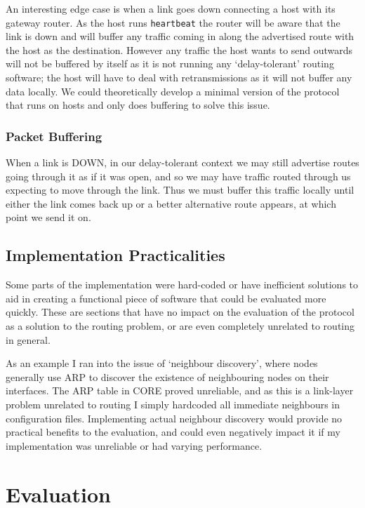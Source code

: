 \documentclass[10pt,twoside,a4paper]{article}
\begin{document}
An interesting edge case is when a link goes down connecting a host with its gateway router. As the host runs \texttt{heartbeat} the router will be aware that the link is down and will buffer any traffic coming in along the advertised route with the host as the destination. However any traffic the host wants to send outwards will not be buffered by itself as it is not running any `delay-tolerant' routing software; the host will have to deal with retransmissions as it will not buffer any data locally. We could theoretically develop a minimal version of the protocol that runs on hosts and only does buffering to solve this issue.

\subsubsection{Packet Buffering}

When a link is DOWN, in our delay-tolerant context we may still advertise routes going through it as if it was open, and so we may have traffic routed through us expecting to move through the link. Thus we must buffer this traffic locally until either the link comes back up or a better alternative route appears, at which point we send it on.


\subsection{Implementation Practicalities}

Some parts of the implementation were hard-coded or have inefficient solutions to aid in creating a functional piece of software that could be evaluated more quickly. These are sections that have no impact on the evaluation of the protocol as a solution to the routing problem, or are even completely unrelated to routing in general.

As an example I ran into the issue of `neighbour discovery', where nodes generally use ARP to discover the existence of neighbouring nodes on their interfaces. The ARP table in CORE proved unreliable, and as this is a link-layer problem unrelated to routing I simply hardcoded all immediate neighbours in configuration files. Implementing actual neighbour discovery would provide no practical benefits to the evaluation, and could even negatively impact it if my implementation was unreliable or had varying performance.


\section{Evaluation}
\end{document}
